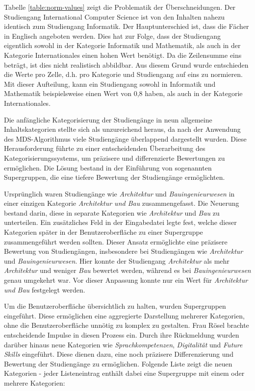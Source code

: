 Tabelle \ref{table:norm-values} zeigt die Problematik der Überschneidungen. Der
Studiengang International Computer Science ist von den Inhalten nahezu
identisch zum Studiengang Informatik. Der Hauptunterschied ist, dass die Fächer
in Englisch angeboten werden. Dies hat zur Folge, dass der Studiengang
eigentlich sowohl in der Kategorie Informatik und Mathematik, als auch in der
Kategorie Internationales einen hohen Wert benötigt. Da die Zeilensumme eins
beträgt, ist dies nicht realistisch abbildbar. Aus diesem Grund wurde
entschieden die Werte pro Zelle, d.h. pro Kategorie und Studiengang auf eins
zu normieren. Mit dieser Aufteilung, kann ein Studiengang sowohl in Informatik
und Mathematik beispielsweise einen Wert von 0,8 haben, als auch in der
Kategorie Internationales.

Die anfängliche Kategorisierung der Studiengänge in neun allgemeine
Inhaltskategorien stellte sich als unzureichend heraus, da nach der Anwendung
des MDS-Algorithmus viele Studiengänge überlappend dargestellt wurden. Diese
Herausforderung führte zu einer entscheidenden Überarbeitung des
Kategorisierungssystems, um präzisere und differenzierte Bewertungen zu
ermöglichen. Die Lösung bestand in der Einführung von sogenannten Supergruppen,
die eine tiefere Bewertung der Studiengänge ermöglichten.

Ursprünglich waren Studiengänge wie \textit{Architektur} und
\textit{Bauingenieurwesen} in einer einzigen Kategorie
\textit{Architektur und Bau} zusammengefasst. Die Neuerung bestand darin, diese
in separate Kategorien wie \textit{Architektur} und \textit{Bau} zu unterteilen.
Ein zusätzliches Feld in der Eingabedatei legte fest, welche dieser Kategorien
später in der Benutzeroberfläche zu einer Supergruppe zusammengeführt werden
sollten. Dieser Ansatz ermöglichte eine präzisere Bewertung von Studiengängen,
insbesondere bei Studiengängen wie \textit{Architektur} und
\textit{Bauingenieurwesen}. Hier konnte der Studiengang \textit{Architektur} als
mehr \textit{Architektur} und weniger \textit{Bau} bewertet werden, während es
bei \textit{Bauingenieurwesen} genau umgekehrt war. Vor dieser Anpassung konnte
nur ein Wert für \textit{Architektur und Bau} festgelegt werden.

Um die Benutzeroberfläche übersichtlich zu halten, wurden Supergruppen
eingeführt. Diese ermöglichen eine aggregierte Darstellung mehrerer Kategorien,
ohne die Benutzeroberfläche unnötig zu komplex zu gestalten. Frau Rösel brachte
entscheidende Impulse in diesen Prozess ein. Durch ihre Rückmeldung wurden
darüber hinaus neue Kategorien wie \textit{Sprachkompetenzen},
\textit{Digitalität} und \textit{Future Skills} eingeführt. Diese dienen dazu,
eine noch präzisere Differenzierung und Bewertung der Studiengänge zu
ermöglichen. Folgende Liste zeigt die neuen Kategorien - jeder Listeneintrag
enthält dabei eine Supergruppe mit einem oder mehrere Kategorien:

